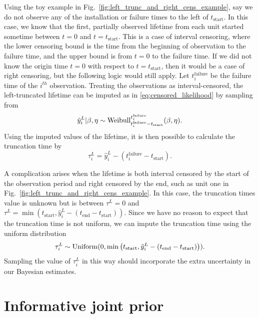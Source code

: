 Using the toy example in Fig.~\ref{fig:left_trunc_and_right_cens_example}, say we do not observe any of the installation or failure times to the left of $t_\text{start}$. In this case, we know that the first, partially observed lifetime from each unit started sometime between $t = 0$ and $t = t_\text{start}$. This is a case of interval censoring, where the lower censoring bound is the time from the beginning of observation to the failure time, and the upper bound is from $t = 0$ to the failure time. If we did not know the origin time $t = 0$ with respect to $t = t_\text{start}$, then it would be a case of right censoring, but the following logic would still apply. Let $t^{\text{failure}}_{i}$ be the failure time of the $i^{th}$ observation. Treating the observations as interval-censored, the left-truncated lifetime can be imputed as in \eqref{eq:censored_likelihood} by sampling from
\begin{equation}
    \hat{y}^L_i|\beta, \eta \sim \hbox{Weibull}^{t^{\text{failure}}_{i}}_{t^{\text{failure}}_{i} - t_\text{start}}(\beta, \eta).
\end{equation}
Using the imputed values of the lifetime, it is then possible to calculate the truncation time by
\begin{equation}
    \tau^L_i = \hat{y}^L_i - \left(t^{\text{failure}}_{i} - t_\text{start}\right).
\end{equation}

A complication arises when the lifetime is both interval censored by the start of the observation period and right censored by the end, such as unit one in Fig.~\ref{fig:left_trunc_and_right_cens_example}. In this case, the truncation times value is unknown but is between $\tau^L = 0$ and $\tau^L = \min\left(t_\text{start}, \hat{y}^L_i - (t_\text{end} - t_\text{start})\right)$. Since we have no reason to expect that the truncation time is not uniform, we can impute the truncation time using the uniform distribution
\begin{equation}
    \label{eq:imp-trun-times}
    \tau^L_i \sim \hbox{Uniform}(0, \min\left(t_\text{start}, \hat{y}^L_i - (t_\text{end} - t_\text{start})\right)).
\end{equation}
Sampling the value of $\tau^L_i$ in this way should incorporate the extra uncertainty in our Bayesian estimates.

\section{Informative joint prior} \label{sec:weibull-joint-prior}

